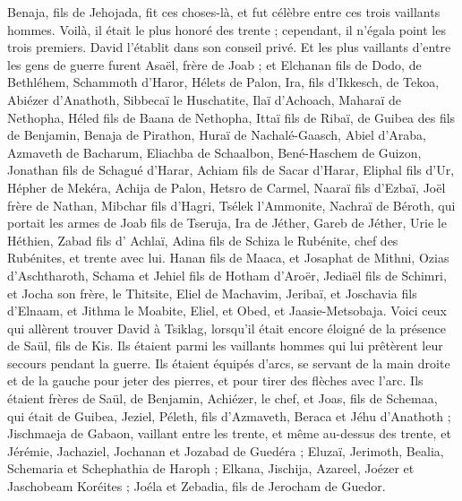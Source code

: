 \begin{multicols}{2}
Benaja, fils de Jehojada, fit ces choses-là, et fut célèbre entre ces trois vaillants hommes.
Voilà, il était le plus honoré des trente ; cependant, il n'égala point les trois premiers. David l'établit dans son conseil privé.
Et les plus vaillants d'entre les gens de guerre furent Asaël, frère de Joab ; et Elchanan fils de Dodo, de Bethléhem,
Schammoth d'Haror, Hélets de Palon,
Ira, fils d'Ikkesch, de Tekoa, Abiézer d'Anathoth,
Sibbecaï le Huschatite, Ilaï d'Achoach,
Maharaï de Nethopha, Héled fils de Baana de Nethopha,
Ittaï fils de Ribaï, de Guibea des fils de Benjamin, Benaja de Pirathon,
Huraï de Nachalé-Gaasch, Abiel d'Araba,
Azmaveth de Bacharum, Eliachba de Schaalbon,
Bené-Haschem de Guizon, Jonathan fils de Schagué d'Harar,
Achiam fils de Sacar d'Harar, Eliphal fils d'Ur,
Hépher de Mekéra, Achija de Palon,
Hetsro de Carmel, Naaraï fils d'Ezbaï,
Joël frère de Nathan, Mibchar fils d'Hagri,
Tsélek l'Ammonite, Nachraï de Béroth, qui portait les armes de Joab fils de Tseruja,
Ira de Jéther, Gareb de Jéther,
Urie le Héthien, Zabad fils d' Achlaï,
Adina fils de Schiza le Rubénite, chef des Rubénites, et trente avec lui.
Hanan fils de Maaca, et Josaphat de Mithni,
Ozias d'Aschtharoth, Schama et Jehiel fils de Hotham d'Aroër,
Jediaël fils de Schimri, et Jocha son frère, le Thitsite,
Eliel de Machavim, Jeribaï, et Joschavia fils d'Elnaam, et Jithma le Moabite,
Eliel, et Obed, et Jaasie-Metsobaja.
\VerseOne{}Voici ceux qui allèrent trouver David à Tsiklag, lorsqu'il était encore éloigné de la présence de Saül, fils de Kis. Ils étaient parmi les vaillants hommes qui lui prêtèrent leur secours pendant la guerre.
Ils étaient équipés d'arcs, se servant de la main droite et de la gauche pour jeter des pierres, et pour tirer des flèches avec l'arc. Ils étaient frères de Saül, de Benjamin,
Achiézer, le chef, et Joas, fils de Schemaa, qui était de Guibea, Jeziel, Péleth, fils d'Azmaveth, Beraca et Jéhu d'Anathoth ;
Jischmaeja de Gabaon, vaillant entre les trente, et même au-dessus des trente, et Jérémie, Jachaziel, Jochanan et Jozabad de Guedéra ;
Eluzaï, Jerimoth, Bealia, Schemaria et Schephathia de Haroph ;
Elkana, Jischija, Azareel, Joézer et Jaschobeam Koréites ;
Joéla et Zebadia, fils de Jerocham de Guedor.

\end{multicols}
